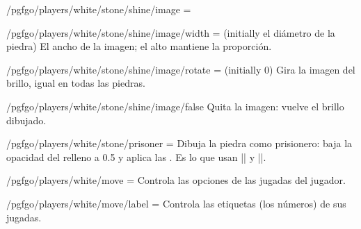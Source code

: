 \begin{goban}[9, stone = {radius = 4pt}, mark = {line = {color = red}}]
\begin{key}{/pgfgo/players/white/stone/shine/image = }
\begin{codeexample}[width=4cm]
		\begin{goban}[5, partial = B2:D4]
		\end{goban}
	\end{codeexample}
\end{key}


\begin{key}{/pgfgo/players/white/stone/shine/image/width =  (initially el diámetro de la piedra)}
	El ancho de la imagen; el alto mantiene la proporción.
\end{key}

\begin{key}{/pgfgo/players/white/stone/shine/image/rotate =  (initially 0)}
	Gira la imagen del brillo, igual en todas las piedras.

	\begin{codeexample}[width=4cm]

		\begin{goban}[5, partial = B2:D4]
		\end{goban}
	\end{codeexample}
\end{key}

\begin{stylekey}{/pgfgo/players/white/stone/shine/image/false}
	Quita la imagen: vuelve el brillo dibujado.
\end{stylekey}

\begin{key}{/pgfgo/players/white/stone/prisoner = }
	Dibuja la piedra como prisionero: baja la opacidad del relleno a 0.5 y aplica las . Es lo que usan |\prisoner| y |\prisoners|.
\end{key}

\begin{key}{/pgfgo/players/white/move = }
	Controla las opciones de las jugadas del jugador.
\end{key}

\begin{key}{/pgfgo/players/white/move/label = }
	Controla las etiquetas (los números) de sus jugadas.


\end{key}
\end{goban}
